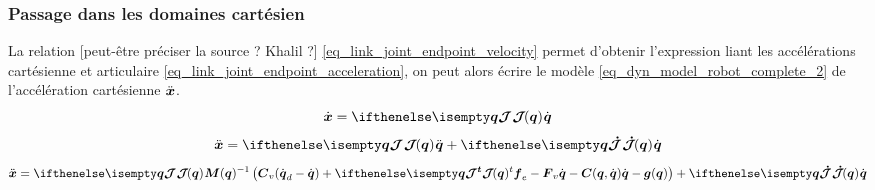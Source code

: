 \documentclass[12pt, a4paper]{article} %
\numberwithin{equation}{section}
\begin{document}
	\subsubsection{Passage dans les domaines cartésien}
	La relation [peut-être préciser la source ? Khalil ?] \cref{eq_link_joint_endpoint_velocity} permet d'obtenir l'expression liant les accélérations cartésienne et articulaire \cref{eq_link_joint_endpoint_acceleration}, on peut alors écrire le modèle \cref{eq_dyn_model_robot_complete_2} de l'accélération cartésienne $ \ddot{\vect{x}} $.
	\begin{equation} \label{eq_link_joint_endpoint_velocity}
	\dot{\vect{X}} = \jacobian{\vect{q}}{}{} \dot{\vect{q}}
	\end{equation}
	\begin{equation} \label{eq_link_joint_endpoint_acceleration}
	\ddot{\vect{X}} = \jacobian{\vect{q}}{}{} \ddot{\vect{q}} + \jacobianDot{\vect{q}}{}{} \dot{\vect{q}}
	\end{equation}
	\begin{equation} \label{eq_dyn_model_robot_complete_2}
	\ddot{\vect{x}} =  \jacobian{\vect{q}
	}{}{}\matr{M}(\vect{q})^{-1} \left(  \matr{C}_v (\dot{\vect{q}}_d - \dot{\vect{q}}) + \jacobian{\vect{q}
	}{}{t} \vect{f}_{e} - \matr{F}_v \dot{\vect{q}} - \matr{C}(\vect{q}, \dot{\vect{q}}) \dot{\vect{q}} - \vect{g}(\vect{q}) \right) + \jacobianDot{\vect{q}}{}{} \dot{\vect{q}}
	\end{equation}
\end{document}
